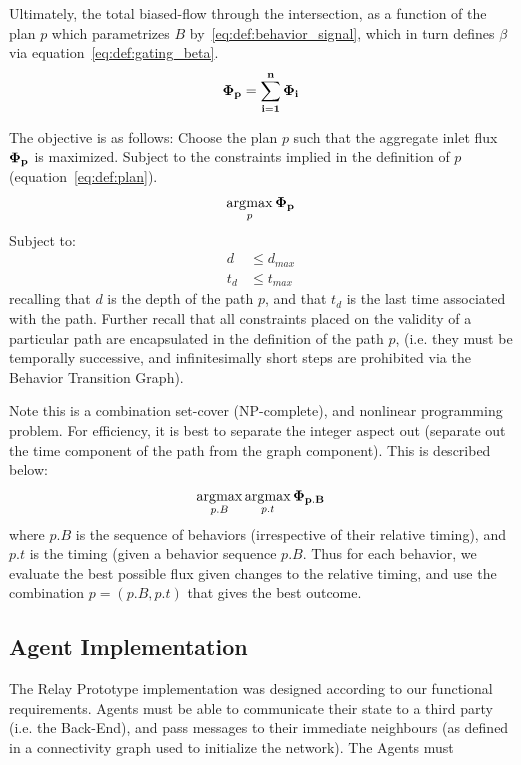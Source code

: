 \documentclass{report}
\DeclareMathOperator*{\argmax}{\arg\!\max}
\begin{document}
Ultimately, the total biased-flow through the intersection, as a function of the plan $p$ which parametrizes $B$ by~\eqref{eq:def:behavior_signal}, which in turn defines $\beta$ via equation~\eqref{eq:def:gating_beta}.
\begin{equation}\label{eq:def:biased_flow}
	\bf{\Phi}_p = \sum_{i=1}^n \Phi_i
\end{equation}

The objective is as follows: Choose the plan $p$ such that the aggregate inlet flux $\bf{\Phi}_p$ is maximized.
Subject to the constraints implied in the definition of $p$ (equation~\eqref{eq:def:plan}).
\begin{equation}\label{eq:def:combined_objective}
	\argmax_p \bf{\Phi}_p
\end{equation}
Subject to:
\begin{align}
	d &\leq d_{max}\\
	t_d &\leq t_{max}
\end{align}
recalling that $d$ is the depth of the path $p$, and that $t_d$ is the last time associated with the path.
Further recall that all constraints placed on the validity of a particular path are encapsulated in the definition of the path $p$, (i.e. they must be temporally successive, and infinitesimally short steps are prohibited via the Behavior Transition Graph).

Note this is a combination set-cover (NP-complete), and nonlinear programming problem.
For efficiency, it is best to separate the integer aspect out (separate out the time component of the path from the graph component).
This is described below:
\begin{equation}\label{eq:def:minlp_objective}
	\argmax_{p.B} \argmax_{p.t} \bf{\Phi}_{p.B}
\end{equation}
where $p.B$ is the sequence of behaviors (irrespective of their relative timing), and $p.t$ is the timing (given a behavior sequence $p.B$.
Thus for each behavior, we evaluate the best possible flux given changes to the relative timing, and use the combination $p =  (p.B, p.t)$ that gives the best outcome.

\subsection{Agent Implementation}

The Relay Prototype implementation was designed according to our functional requirements.
Agents must be able to communicate their state to a third party (i.e. the Back-End), and pass messages to their immediate neighbours (as defined in a connectivity graph used to initialize the network).
The Agents must 
\end{document}
